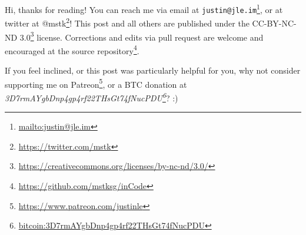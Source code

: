 \documentclass[]{article}
\renewcommand{\href}[2]{#2\footnote{\url{#1}}}
\begin{document}
Hi, thanks for reading! You can reach me via email at
\href{mailto:justin@jle.im}{\nolinkurl{justin@jle.im}}, or at twitter at
\href{https://twitter.com/mstk}{@mstk}! This post and all others are published
under the \href{https://creativecommons.org/licenses/by-nc-nd/3.0/}{CC-BY-NC-ND
3.0} license. Corrections and edits via pull request are welcome and encouraged
at \href{https://github.com/mstksg/inCode}{the source repository}.

If you feel inclined, or this post was particularly helpful for you, why not
consider \href{https://www.patreon.com/justinle}{supporting me on Patreon}, or a
BTC donation at
\emph{\href{bitcoin:3D7rmAYgbDnp4gp4rf22THsGt74fNucPDU}{3D7rmAYgbDnp4gp4rf22THsGt74fNucPDU}}?
:)
\end{document}
